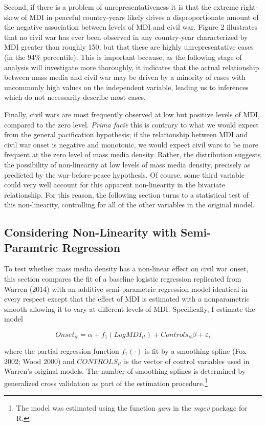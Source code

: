 \documentclass[11pt,article,oneside]{memoir}
\begin{document}
Second, if there is a problem of unrepresentativeness it is that the
extreme right-skew of MDI in peaceful country-years likely drives a
disproportionate amount of the negative association between levels of
MDI and civil war. Figure 2 illustrates that no civil war has ever been
observed in any country-year characterized by MDI greater than roughly
150, but that these are highly unrepresentative cases (in the 94\%
percentile). This is important because, as the following stage of
analysis will investigate more thoroughly, it indicates that the actual
relationship between mass media and civil war may be driven by a
minority of cases with uncommonly high values on the independent
variable, leading us to inferences which do not necessarily describe
most cases.

Finally, civil wars are most frequently observed at low but positive
levels of MDI, compared to the zero level. \emph{Prima facie} this is
contrary to what we would expect from the general pacification
hypothesis; if the relationship between MDI and civil war onset is
negative and monotonic, we would expect civil wars to be more frequent
at the zero level of mass media density. Rather, the distribution
suggests the possibility of non-linearity at low levels of mass media
density, precisely as predicted by the war-before-peace hypothesis. Of
course, some third variable could very well account for this apparent
non-linearity in the bivariate relationship. For this reason, the
following section turns to a statistical test of this non-linearity,
controlling for all of the other variables in the original model.

\subsection{Considering Non-Linearity with Semi-Paramtric
Regression}\label{considering-non-linearity-with-semi-paramtric-regression}

To test whether mass media density has a non-linear effect on civil war
onset, this section compares the fit of a baseline logistic regression
replicated from Warren (2014) with an additive semi-parametric
regression model identical in every respect except that the effect of
MDI is estimated with a nonparametric smooth allowing it to vary at
different levels of MDI. Specifically, I estimate the model

\[ Onset_{it} = \alpha + f_1 (LogMDI_{it}) + Controls_{it} \beta  + \varepsilon_i \]

where the partial-regression function $f_1 (\cdot)$ is fit by a
smoothing spline (Fox 2002; Wood 2000) and $CONTROLS_{it}$ is the vector
of control variables used in Warren's original models. The number of
smoothing splines is determined by generalized cross validation as part
of the estimation procedure.\footnote{The model was estimated using the
  function \emph{gam} in the \emph{mgcv} package for R.}
\end{document}
